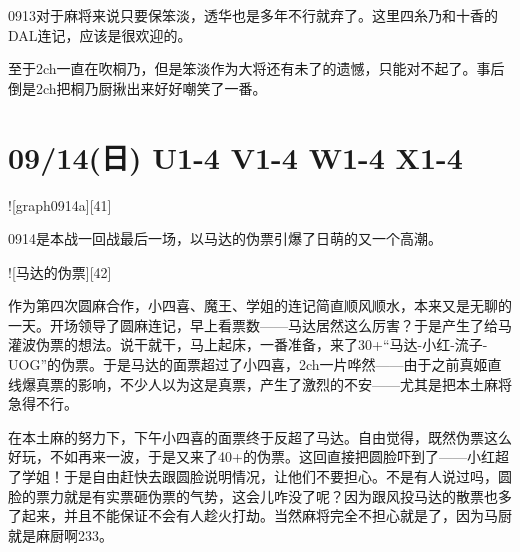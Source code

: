 0913对于麻将来说只要保笨淡，透华也是多年不行就弃了。这里四糸乃和十香的DAL连记，应该是很欢迎的。

至于2ch一直在吹桐乃，但是笨淡作为大将还有未了的遗憾，只能对不起了。事后倒是2ch把桐乃厨揪出来好好嘲笑了一番。

\section{09/14(日) U1-4 V1-4 W1-4 X1-4}


![graph0914a][41]

0914是本战一回战最后一场，以马达的伪票引爆了日萌的又一个高潮。

![马达的伪票][42]

作为第四次圆麻合作，小四喜、魔王、学姐的连记简直顺风顺水，本来又是无聊的一天。开场领导了圆麻连记，早上看票数——马达居然这么厉害？于是产生了给马灌波伪票的想法。说干就干，马上起床，一番准备，来了30+“马达-小红-流子-UOG”的伪票。于是马达的面票超过了小四喜，2ch一片哗然——由于之前真姬直线爆真票的影响，不少人以为这是真票，产生了激烈的不安——尤其是把本土麻将急得不行。

在本土麻的努力下，下午小四喜的面票终于反超了马达。自由觉得，既然伪票这么好玩，不如再来一波，于是又来了40+的伪票。这回直接把圆脸吓到了——小红超了学姐！于是自由赶快去跟圆脸说明情况，让他们不要担心。不是有人说过吗，圆脸的票力就是有实票砸伪票的气势，这会儿咋没了呢？因为跟风投马达的散票也多了起来，并且不能保证不会有人趁火打劫。当然麻将完全不担心就是了，因为马厨就是麻厨啊233。

